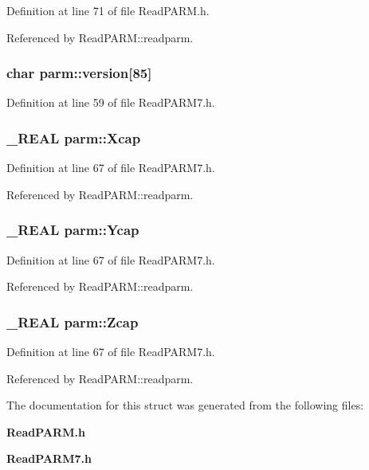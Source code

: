 Definition at line 71 of file Read\-PARM.h.

Referenced by Read\-PARM::readparm.
\subsubsection{\setlength{\rightskip}{0pt plus 5cm}char parm::version[85]}\label{structparm_m88}




Definition at line 59 of file Read\-PARM7.h.
\subsubsection{\setlength{\rightskip}{0pt plus 5cm}\_\-REAL parm::Xcap}\label{structparm_m52}




Definition at line 67 of file Read\-PARM7.h.

Referenced by Read\-PARM::readparm.
\subsubsection{\setlength{\rightskip}{0pt plus 5cm}\_\-REAL parm::Ycap}\label{structparm_m53}




Definition at line 67 of file Read\-PARM7.h.

Referenced by Read\-PARM::readparm.
\subsubsection{\setlength{\rightskip}{0pt plus 5cm}\_\-REAL parm::Zcap}\label{structparm_m54}




Definition at line 67 of file Read\-PARM7.h.

Referenced by Read\-PARM::readparm.

The documentation for this struct was generated from the following files:\begin{CompactItemize}
\item 
{\bf Read\-PARM.h}\item 
{\bf Read\-PARM7.h}\end{CompactItemize}
